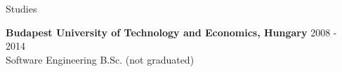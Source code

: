 \documentclass{resume} %
\begin{document}

\begin{rSection}{Studies}

{\bf Budapest University of Technology and Economics, Hungary} \hfill {2008 - 2014} \\
Software Engineering B.Sc. (not graduated) \smallskip
\end{rSection}

\end{document}
